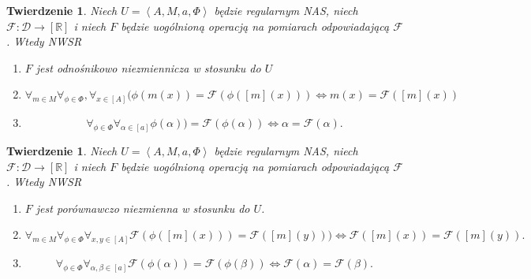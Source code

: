 \documentclass[12pt,a4paper]{report}
\newtheorem{tw}[definition]{Twierdzenie}
\newcommand{\domkniecie}[1]{\left\lbrack{#1}\right\rbrack}
\newcommand{\tuple}[1]{\left\langle {#1} \right\rangle}
\begin{document}
\begin{tw}
Niech $U=\tuple{A,M,a,\Phi}$ będzie regularnym NAS, niech $\mathcal{F}:\mathcal{D}\to \domkniecie{\mathbb{R}}$ i niech $F$ będzie uogólnioną operacją na pomiarach odpowiadającą $\mathcal{F}$. Wtedy
NWSR
\begin{enumerate}
\item
$F$ jest odnośnikowo niezmiennicza w stosunku do $U$
\item
$$
\forall_{m \in M}\forall_{\phi \in \Phi},\forall_{x \in \domkniecie{A}} 
(\phi(m(x))=\mathcal{F}(\phi(\domkniecie{m}(x))) \iff m(x)=\mathcal{F}(\domkniecie{m}(x))
$$
\item
$$
\forall_{\phi \in \Phi}\forall_{\alpha \in \domkniecie{a}} \phi(\alpha))=\mathcal{F}(\phi(\alpha)) \iff \alpha=\mathcal{F}(\alpha).
$$
\end{enumerate}

\end{tw}
\begin{tw}
Niech $U=\tuple{A,M,a,\Phi}$ będzie regularnym NAS, niech $\mathcal{F}:\mathcal{D}\to \domkniecie{\mathbb{R}}$ i niech $F$ będzie uogólnioną operacją na pomiarach odpowiadającą $\mathcal{F}$. Wtedy
NWSR
\begin{enumerate}
\item
$F$ jest porównawczo niezmienna w stosunku do $U$.
\item
$$
\forall_{m \in M}\forall_{\phi \in \Phi} \forall_{x,y \in \domkniecie{A}} \mathcal{F}(\phi(\domkniecie{m}(x)))=\mathcal{F}(\domkniecie{m}(y))) \iff \mathcal{F}(\domkniecie{m}(x))=\mathcal{F}(\domkniecie{m}(y)).
$$
\item
$$
\forall_{\phi \in \Phi} \forall_{\alpha, \beta \in \domkniecie{a}}  \mathcal{F}(\phi(\alpha))=\mathcal{F}(\phi(\beta)) \iff \mathcal{F}(\alpha)=\mathcal{F}(\beta).
$$
\end{enumerate}

\end{tw}
\end{document}
